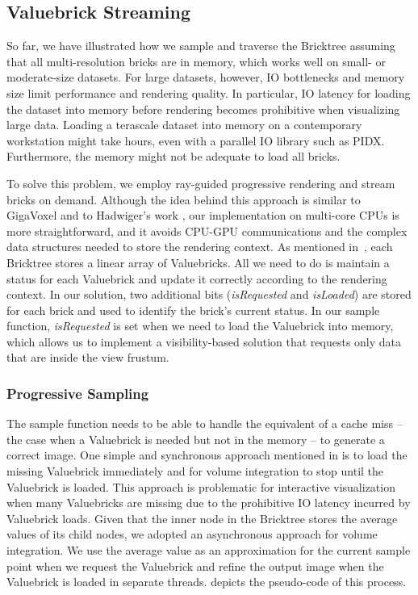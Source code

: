 \subsection{Valuebrick Streaming}
So far, we have illustrated how we sample and traverse the Bricktree assuming that all
multi-resolution bricks are in memory, which works well on small- or moderate-size datasets. 
For large datasets, however, IO bottlenecks and memory size limit performance and rendering
quality. In particular, IO latency for loading the dataset into memory before
rendering becomes prohibitive when visualizing large data. Loading a
terascale dataset into memory on a contemporary workstation might take hours, even with a parallel IO
library such as PIDX. Furthermore, the memory might not be adequate to load all bricks. 


To solve this problem, we employ ray-guided progressive rendering and stream bricks
on demand. Although the idea behind this approach is similar to GigaVoxel\cite{crassin2009gigavoxels}
and to Hadwiger's work \cite{hadwiger2012interactive}, our implementation on multi-core CPUs
is more straightforward, and it avoids CPU-GPU communications and the complex data structures
needed to store the rendering context. As mentioned in~,
each Bricktree stores a linear array of Valuebricks. All we need to do is maintain a
status for each Valuebrick and update it correctly according to the rendering context.
In our solution, two additional bits (\textit{isRequested} and \textit{isLoaded}) are stored 
for each brick and used to identify the brick's current status. In our sample function, 
\textit{isRequested} is set when we need to load the Valuebrick
into memory, which allows us to implement a visibility-based solution that requests only
data that are inside the view frustum. 




\subsubsection{Progressive Sampling}
The sample function needs to be able to handle the equivalent of a cache miss -- the case
when a Valuebrick is needed but not in the memory -- to generate a correct image.
One simple and synchronous approach mentioned in \cite{crassin2009gigavoxels} is to
load the missing Valuebrick immediately and for volume integration to stop until 
the Valuebrick is loaded. 
This approach is problematic for interactive visualization when many Valuebricks are missing 
due to the prohibitive IO latency incurred by Valuebrick loads. Given that the inner node
in the Bricktree stores the average values of its child nodes, we adopted an
asynchronous approach for volume integration. We use the average value as an
approximation for the current sample point when we request the Valuebrick and
refine the output image when the Valuebrick is loaded in separate threads. 
 depicts the pseudo-code of this process. 



